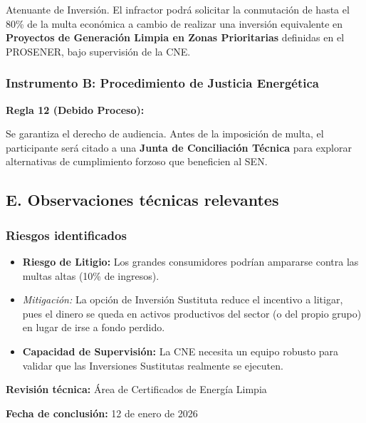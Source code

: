 \documentclass{cel}
\begin{document}
\textquotedbl{}Atenuante de Inversión. El infractor podrá solicitar la conmutación de hasta el 80\% de la multa económica a cambio de realizar una inversión equivalente en \textbf{Proyectos de Generación Limpia en Zonas Prioritarias} definidas en el PROSENER, bajo supervisión de la CNE.\textquotedbl{}


\subsubsection{Instrumento B: Procedimiento de Justicia Energética}
\nopagebreak

\textbf{Regla 12 (Debido Proceso):}

\textquotedbl{}Se garantiza el derecho de audiencia. Antes de la imposición de multa, el participante será citado a una \textbf{Junta de Conciliación Técnica} para explorar alternativas de cumplimiento forzoso que beneficien al SEN.\textquotedbl{}


\subsection{E. Observaciones técnicas relevantes}
\nopagebreak

\subsubsection{Riesgos identificados}
\nopagebreak

\begin{itemize}
\item \textbf{Riesgo de Litigio:} Los grandes consumidores podrían ampararse contra las multas altas (10\% de ingresos).
\item \textit{Mitigación:} La opción de \textquotedbl{}Inversión Sustituta\textquotedbl{} reduce el incentivo a litigar, pues el dinero se queda en activos productivos del sector (o del propio grupo) en lugar de irse a \textquotedbl{}fondo perdido\textquotedbl{}.
\item \textbf{Capacidad de Supervisión:} La CNE necesita un equipo robusto para validar que las \textquotedbl{}Inversiones Sustitutas\textquotedbl{} realmente se ejecuten.


\end{itemize}
\textbf{Revisión técnica:} Área de Certificados de Energía Limpia

\textbf{Fecha de conclusión:} 12 de enero de 2026


{}
\end{document}
